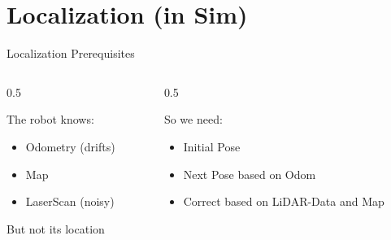 \documentclass[aspectratio=169, 11pt]{beamer}
\begin{document}
\section{Localization (in Sim)}
\begin{frame}{Localization Prerequisites}
  \begin{columns}[T]
    \begin{column}{0.5\textwidth}
      \begin{block}{The robot knows:}
          \begin{itemize}
            \item Odometry (drifts)
            \item Map
            \item LaserScan (noisy)
          \end{itemize}
          But not its location
      \end{block}
    \end{column}
    
    \begin{column}{0.5\textwidth}
      \begin{block}{So we need:}
          \begin{itemize}
            \item Initial Pose
            \item Next Pose based on Odom
            \item Correct based on LiDAR-Data and Map
          \end{itemize}
      \end{block}
    \end{column}
  \end{columns}
\end{frame}
\end{document}
